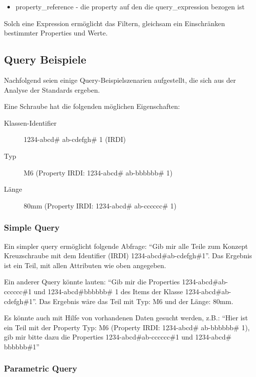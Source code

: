 \begin{itemize}
\item property\_reference - die property auf den die query\_expression bezogen ist
\end{itemize}
Solch eine Expression ermöglicht das Filtern, gleichsam ein Einschränken bestimmter Properties und Werte. 

\subsection{Query Beispiele}\label{kap:query_beispiele}

Nachfolgend seien einige Query-Beispielszenarien aufgestellt, die sich aus der Analyse der Standards ergeben.

Eine Schraube hat die folgenden möglichen Eigenschaften: 

\begin{description}
\item[Klassen-Identifier] 1234-abcd\# ab-cdefgh\# 1 (IRDI)
\item[Typ] M6 (Property IRDI: 1234-abcd\# ab-bbbbbb\# 1)
\item[Länge] 80mm (Property IRDI: 1234-abcd\# ab-cccccc\# 1)
\end{description}

\subsubsection{Simple Query}

Ein simpler query ermöglicht folgende Abfrage: \enquote{Gib mir alle Teile zum Konzept Kreuzschraube mit dem Identifier (IRDI) 1234-abcd\#ab-cdefgh\#1}. Das Ergebnis ist ein Teil, mit allen Attributen wie oben angegeben. 

Ein anderer Query könnte lauten: \enquote{Gib mir die Properties 1234-abcd\#ab-cccccc\#1 und 1234-abcd\#bbbbbb\# 1 des Items der Klasse 1234-abcd\#ab-cdefgh\#1}. Das Ergebnis wäre das Teil mit Typ: M6 und der Länge: 80mm.

Es könnte auch mit Hilfe von vorhandenen Daten gesucht werden, z.B.:  \enquote{Hier ist ein Teil mit der Property Typ: M6 (Property IRDI: 1234-abcd\# ab-bbbbbb\# 1), gib mir bitte dazu die Properties 1234-abcd\#ab-cccccc\#1 und 1234-abcd\# bbbbbb\#1} 

\subsubsection{Parametric Query}

